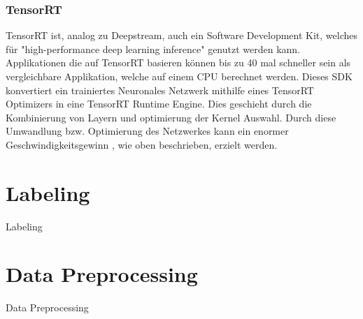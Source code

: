 \documentclass[a4paper,oneside,12pt]{report}
\begin{document}
\begin{onehalfspace}
		\subsection{TensorRT}
		TensorRT ist, analog zu Deepstream, auch ein Software Development Kit, welches für "high-performance deep learning inference"
		 genutzt werden kann.
		Applikationen die auf TensorRT basieren können bis zu 40 mal schneller sein als vergleichbare Applikation, welche auf einem CPU berechnet werden.
		Dieses SDK konvertiert ein trainiertes Neuronales Netzwerk mithilfe eines TensorRT Optimizers in eine TensorRT Runtime Engine. Dies geschieht durch die Kombinierung von Layern und optimierung der Kernel Auswahl.
		Durch diese Umwandlung bzw. Optimierung des Netzwerkes kann ein enormer Geschwindigkeitsgewinn , wie oben beschrieben, erzielt werden.
	\end{onehalfspace}
	\chapter{Labeling}
	\begin{onehalfspace}
		Labeling
	\end{onehalfspace}
	\chapter{Data Preprocessing}
	\begin{onehalfspace}
		Data Preprocessing
	\end{onehalfspace}
\end{document}
